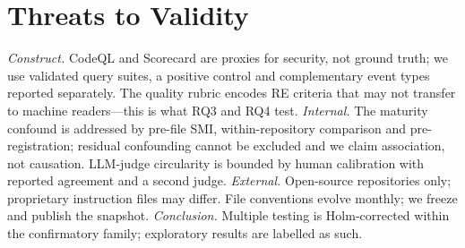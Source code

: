 \documentclass[10pt,conference]{IEEEtran}
\begin{document}
\section{Threats to Validity}
\emph{Construct.} CodeQL and Scorecard are proxies for security, not ground truth; we use validated query suites, a positive control and complementary event types reported separately. The quality rubric encodes RE criteria that may not transfer to machine readers---this is what RQ3 and RQ4 test. \emph{Internal.} The maturity confound is addressed by pre-file SMI, within-repository comparison and pre-registration; residual confounding cannot be excluded and we claim association, not causation. LLM-judge circularity is bounded by human calibration with reported agreement and a second judge. \emph{External.} Open-source repositories only; proprietary instruction files may differ. File conventions evolve monthly; we freeze and publish the snapshot. \emph{Conclusion.} Multiple testing is Holm-corrected within the confirmatory family; exploratory results are labelled as such.



\end{document}
